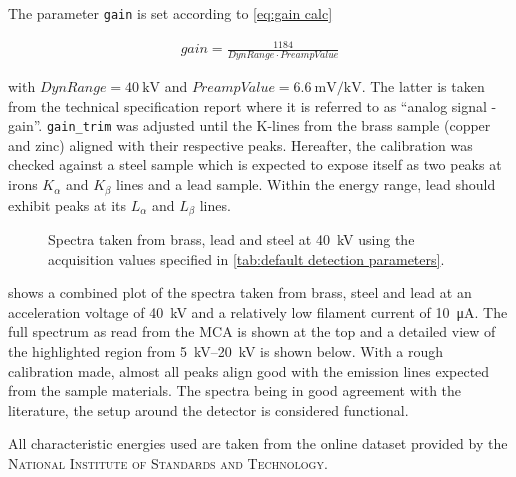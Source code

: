         The parameter \texttt{gain} is set according to \cref{eq:gain calc}\cite{Manual.HandelAPIManual.Xiang}

        \begin{align}
            gain = \frac{1184}{DynRange \cdot PreampValue}
            \label{eq:gain calc}
        \end{align}

        with \(DynRange = \qty{40}{\kV}\) and \(PreampValue = \qty{6.6}{\milli\volt\per\kV}\).
        The latter is taken from the technical specification report where it is referred to as ``analog signal - gain''.
        \texttt{gain\_trim} was adjusted until the K-lines from the brass sample (copper and zinc) aligned with their respective peaks.
        Hereafter, the calibration was checked against a steel sample which is expected to expose itself as two peaks at irons \(K_{\alpha}\) and \(K_{\beta}\) lines and a lead sample.
        Within the energy range, lead should exhibit peaks at its \(L_{\alpha}\) and \(L_{\beta}\) lines.

        \begin{figure}[h]
            \centering
            
            \caption[Spectra taken from brass, lead and steel]{Spectra taken from brass, lead and steel at \qty{40}{\kV} using the acquisition values specified in \cref{tab:default detection parameters}.}%
            \label{fig:spectra 40kV}
        \end{figure}

         shows a combined plot of the spectra taken from brass, steel and lead at an acceleration voltage of \qty{40}{\kV} and a relatively low filament current of \qty{10}{\uA}.
        The full spectrum as read from the MCA is shown at the top and a detailed view of the highlighted region from \qtyrange{5}{20}{\kV} is shown below.
        With a rough calibration made, almost all peaks align good with the emission lines expected from the sample materials.
        The spectra being in good agreement with the literature, the setup around the detector is considered functional.\par\medskip
        
        All characteristic energies used are taken from the online dataset provided by the \textsc{National Institute of Standards and Technology}\cite{Dataset.XRayTransitionEnergies.2005}.

